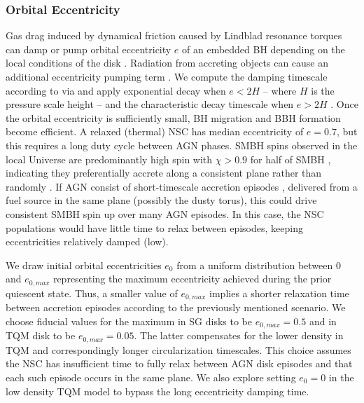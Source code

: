\subsubsection{Orbital Eccentricity}
Gas drag induced by dynamical friction caused by Lindblad resonance torques \citep[referred to as Type I migration][]{GoldreichTremaine79,Ward97} can damp or pump orbital eccentricity $e$ of an embedded BH depending on the local conditions of the disk \citep{McKernan+12, Secunda+21, McKernanFord24, SzolgyenMacLeodLoeb22}.
Radiation from accreting objects can cause an additional eccentricity pumping term \citep{Cornejo+23}.
We compute the damping timescale according to \citet{TanakaWard04} via \citet{McKernanFord24} and apply \citet{PapaloizouLarwood00} exponential decay when $e<2H$ -- where $H$ is the pressure scale height -- and the characteristic decay timescale when $e>2H$ \citep{BitschKley10, Horn+12}.
Once the orbital eccentricity is sufficiently small, BH migration and BBH formation become efficient.
A relaxed (thermal) NSC has median eccentricity of $e=0.7$, but this requires a long duty cycle between AGN phases.
SMBH spins observed in the local Universe are predominantly high spin with $\chi>0.9$ for half of SMBH \citep{Reynolds19}, indicating they preferentially accrete along a consistent plane rather than randomly \citep{Volonteri+05}.
If AGN consist of short-timescale accretion episodes \citep{Schawinski+15,Shen21}, delivered from a fuel source in the same plane (possibly the dusty torus), this could drive consistent SMBH spin up over many AGN episodes.
In this case, the NSC populations would have little time to relax between episodes, keeping eccentricities relatively damped (low).

We draw initial orbital eccentricities $e_0$ from a uniform distribution between 0 and $e_{0,max}$ representing the maximum eccentricity achieved during the prior quiescent state.
Thus, a smaller value of $e_{0,max}$ implies a shorter relaxation time between accretion episodes according to the previously mentioned scenario.
We choose fiducial values for the maximum in SG disks to be $e_{0,max}=0.5$ and in TQM disk to be $e_{0,max}=0.05$.
The latter compensates for the lower density in TQM and correspondingly longer circularization timescales.
This choice assumes the NSC has insufficient time to fully relax between AGN disk episodes and that each such episode occurs in the same plane.
We also explore setting $e_0=0$ in the low density TQM model to bypass the long eccentricity damping time.

